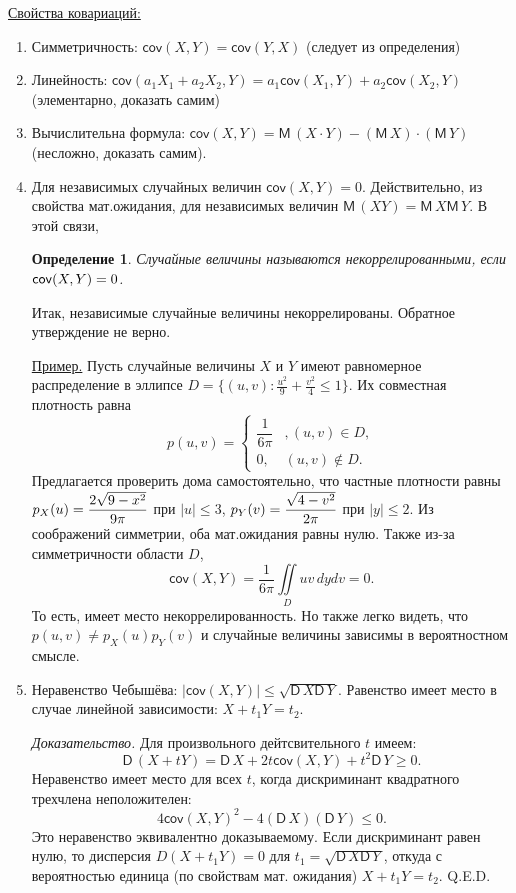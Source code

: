 \documentclass[12pt]{article}
\newtheorem{definition}{Определение}
\newcommand{\M}{{\mathsf M}\,}
\newcommand{\cov}{\mathsf{cov}}
\newcommand{\var}{\mathsf{D}\,}
\newcommand*{\hm}[1]{#1\nobreak\discretionary{}%
  {\hbox{$\mathsurround=0pt #1$}}{}}
\begin{document}
\underline{Свойства ковариаций:}
\begin{enumerate}
\item Симметричность: $\cov(X,Y)=\cov(Y,X)$ (следует из определения)
\item Линейность: $\cov(a_1 X_1+a_2 X_2, Y) = a_1\cov(X_1, Y) + a_2\cov(X_2, Y)$
  (элементарно, доказать самим)
\item Вычислительна формула: $\cov(X,Y) = \M (X \cdot Y) - (\M X)\cdot(\M Y)$ (несложно,
  доказать самим).
\item Для независимых случайных величин $\cov(X,Y)=0$. Действительно, из свойства
  мат.ожидания, для независимых величин $\M(XY)=\M X \M Y$. В этой связи,
  \begin{definition}
    Случайные величины называются \emph{некоррелированными}, если $\cov(X,Y)\hm=0$. 
  \end{definition}
  Итак, независимые случайные величины некоррелированы. Обратное утверждение не
  верно. \par
  \underline{Пример.} Пусть случайные величины $X$ и $Y$ имеют равномерное распределение в
  эллипсе $D=\bigl\{(u,v)\colon \frac{u^2}{9}+\frac{v^2}{4}\leqslant1\bigr\}$. Их совместная
  плотность равна 
  \[
  p(u,v)=
  \begin{cases}
    \dfrac{1}{6\pi}&, (u,v)\in D,\\
    0,  & (u,v)\not\in D.
  \end{cases}
  \]
  Предлагается проверить дома самостоятельно, что частные плотности равны
  $p_X(u)\hm=\dfrac{2\sqrt{9-x^2}}{9\pi}$ при $|u|\leqslant3$,
  $p_Y(v)\hm=\dfrac{\sqrt{4-v^2}}{2\pi}$ при $|y|\leqslant2$. Из соображений симметрии, оба
  мат.ожидания равны нулю. Также из-за симметричности области $D$, 
  \[
  \cov(X,Y)=\dfrac{1}{6\pi}\iint\limits_D uv\,dydv=0.
  \]
  То есть, имеет место некоррелированность. Но также легко видеть, что $p(u,v)\neq p_X(u)
  p_Y(v)$ и случайные величины зависимы в вероятностном смысле.
\item Неравенство Чебышёва: $|\cov(X,Y)|\leqslant \sqrt{\var X \var Y}$. Равенство имеет
  место в случае линейной зависимости: $X+t_1Y=t_2$. \par
  \emph{Доказательство.} Для произвольного дейтсвительного $t$ имеем:
  \[
  \var(X+tY)=\var X + 2t\cov(X,Y)+t^2 \var Y \geqslant0.
  \]
  Неравенство имеет место для всех $t$, когда дискриминант квадратного трехчлена
  неположителен:
  \[
  4\cov(X,Y)^2-4(\var X)(\var Y)\leqslant0.
  \]
  Это неравенство эквивалентно доказываемому. Если дискриминант равен нулю, то 
  дисперсия $D(X+t_1Y)=0$ для $t_1=\sqrt{\var X \var Y}$, откуда с вероятностью единица
  (по свойствам мат. ожидания) $X+ t_1 Y = t_2$. 
\hfill Q.E.D.
\end{enumerate}
\end{document}
